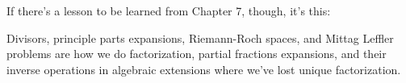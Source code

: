 If there's a lesson to be learned from Chapter 7, though, it's this:

\begin{key point}
Divisors, principle parts expansions, Riemann-Roch spaces, and Mittag
Leffler problems are how we do factorization, partial fractions
expansions, and their inverse operations in algebraic extensions where
we've lost unique factorization.
\end{key point}
